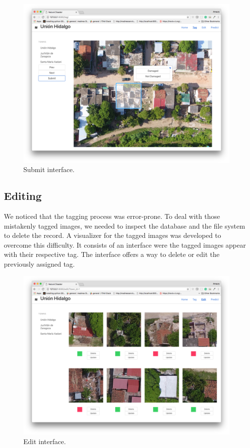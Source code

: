 \begin{figure}[!h]
  \centering
  \includegraphics[width=1\textwidth]{images/small-app-tag.png}
  \caption{Submit interface.}
  \label{fig:submit}
\end{figure}

\subsection{Editing}
We noticed that the tagging process was error-prone. To deal with those mistakenly tagged images, we needed to inspect the database and the file system to delete the record. A visualizer for the tagged images was developed to overcome this difficulty. It consists of an interface were the tagged images appear with their respective tag. The interface offers a way to delete or edit the previously assigned tag.\\

\begin{figure}[!h]
  \centering
  \includegraphics[width=1\textwidth]{images/small-app-edit.png}
  \caption{Edit interface.}
  \label{fig:app-edit}
\end{figure}

